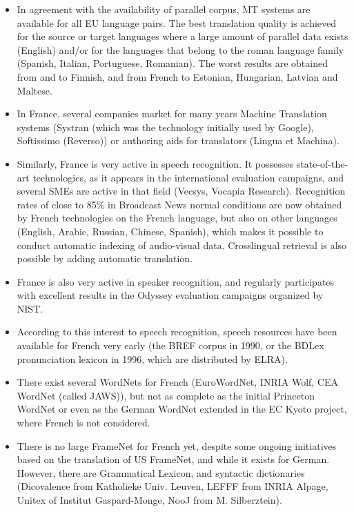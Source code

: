 \begin{multicols}{2}
\begin{itemize}
\item In agreement with the availability of parallel corpus, MT systems are
available for all EU language pairs. The best translation quality is
achieved for the source or target languages where a large amount of
parallel data exists (English) and/or for the languages that belong to
the roman language family (Spanish, Italian, Portuguese,
Romanian). The worst results are obtained from and to Finnish, and
from French to Estonian, Hungarian, Latvian and Maltese.

\item In France, several companies market for many years Machine Translation
systems (Systran (which was the technology initially used by Google),
Softissimo (Reverso)) or authoring aids for translators (Lingua et
Machina).

\item Similarly, France is very active in speech recognition. It possesses
state-of-the-art technologies, as it appears in the international
evaluation campaigns, and several SMEs are active in that field
(Vecsys, Vocapia Research). Recognition rates of close to 85\% in
Broadcast News normal conditions are now obtained by French
technologies on the French language, but also on other languages
(English, Arabic, Russian, Chinese, Spanish), which makes it possible
to conduct automatic indexing of audio-visual data. Crosslingual
retrieval is also possible by adding automatic translation.

\item France is also very active in speaker recognition, and regularly
participates with excellent results in the Odyssey evaluation
campaigns organized by NIST.

\item According to this interest to speech recognition, speech resources
have been available for French very early (the BREF corpus in 1990, or
the BDLex pronunciation lexicon in 1996, which are distributed by
ELRA).

\item There exist several WordNets for French (EuroWordNet, INRIA Wolf, CEA
WordNet (called JAWS)), but not as complete as the initial Princeton
WordNet or even as the German WordNet extended in the EC Kyoto
project, where French is not considered.

\item There is no large FrameNet for French yet, despite some ongoing
initiatives based on the translation of US FrameNet, and while it
exists for German. However, there are Grammatical Lexicon, and
syntactic dictionaries (Dicovalence from Katholieke Univ. Leuven,
LEFFF from INRIA Alpage, Unitex of Institut Gaspard-Monge, NooJ from M. Silberztein).


\end{itemize}
\end{multicols}
